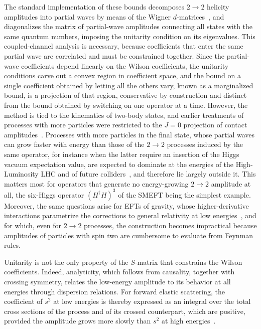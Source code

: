 The standard implementation of these bounds decomposes $2\to2$ helicity amplitudes into partial
waves by means of the Wigner $d$-matrices~\cite{Jacob:1959at}, and diagonalizes the matrix of
partial-wave amplitudes connecting all states with the same quantum numbers, imposing the unitarity
condition on its eigenvalues. This coupled-channel analysis is necessary, because coefficients that
enter the same partial wave are correlated and must be constrained together. Since the partial-wave
coefficients depend linearly on the Wilson coefficients, the unitarity conditions carve out a convex
region in coefficient space, and the bound on a single coefficient obtained by letting all the
others vary, known as a marginalized bound, is a projection of that region, conservative by
construction and distinct from the bound obtained by switching on one operator at a time. However,
the method is tied to the kinematics of two-body states, and earlier treatments of processes with
more particles were restricted to the $J=0$ projection of contact
amplitudes~\cite{Chang:2019vez,Falkowski:2019tft,Abu-Ajamieh:2020yqi,Cohen:2021ucp}. Processes with
more particles in the final state, whose partial waves can grow faster with energy than those of
the $2\to2$ processes induced by the same operator, for instance when the latter require an
insertion of the Higgs vacuum expectation value, are expected to dominate at the energies of the
High-Luminosity LHC and of future colliders~\cite{FCC:2018byv,Accettura:2023ked}, and therefore lie
largely outside it. This matters most for operators that generate no energy-growing $2\to2$
amplitude at all, the six-Higgs operator $(H^\dagger H)^3$ of the SMEFT being the
simplest example. Moreover, the same questions arise
for EFTs of gravity, whose higher-derivative interactions parametrize the corrections to general
relativity at low energies~\cite{Endlich:2017tqa,Ruhdorfer:2019qmk}, and for which, even for $2\to2$
processes, the construction becomes impractical because amplitudes of particles with spin two are
cumbersome to evaluate from Feynman rules.

Unitarity is not the only property of the $S$-matrix that constrains the Wilson coefficients.
Indeed, analyticity, which follows from causality, together with crossing symmetry, relates the
low-energy amplitude to its behavior at all energies through dispersion relations. For forward
elastic scattering, the coefficient of $s^2$ at low energies is thereby expressed as an integral
over the total cross sections of the process and of its crossed counterpart, which are positive,
provided the amplitude grows more slowly than $s^2$ at high energies~\cite{Froissart:1961ux}. 

